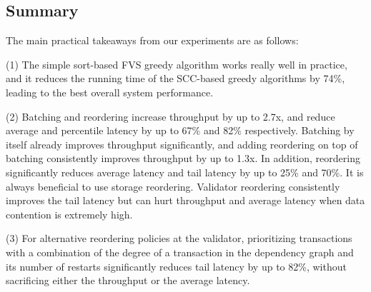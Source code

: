 
%




\subsection{Summary}

The main practical takeaways from our experiments are as follows:

(1) The simple sort-based FVS greedy algorithm works really well in practice, and it reduces the running time of the SCC-based greedy algorithms by 74\%, leading to the best overall system performance. 
 
(2) Batching and reordering increase throughput by up to 2.7x, and reduce average and percentile latency by up to 67\% and 82\% respectively.
Batching by itself already improves throughput significantly, and adding reordering on top of batching consistently improves throughput by up to 1.3x. In addition, reordering significantly reduces average latency and tail latency by up to 25\% and 70\%. It is always beneficial to use storage reordering. Validator reordering consistently improves the tail latency but can hurt throughput and average latency when data contention is extremely high.

(3) For alternative reordering policies at the validator, prioritizing transactions with a combination of the degree of a transaction in the dependency graph and its number of restarts significantly reduces tail latency by up to 82\%, without sacrificing either the throughput or the average latency.


